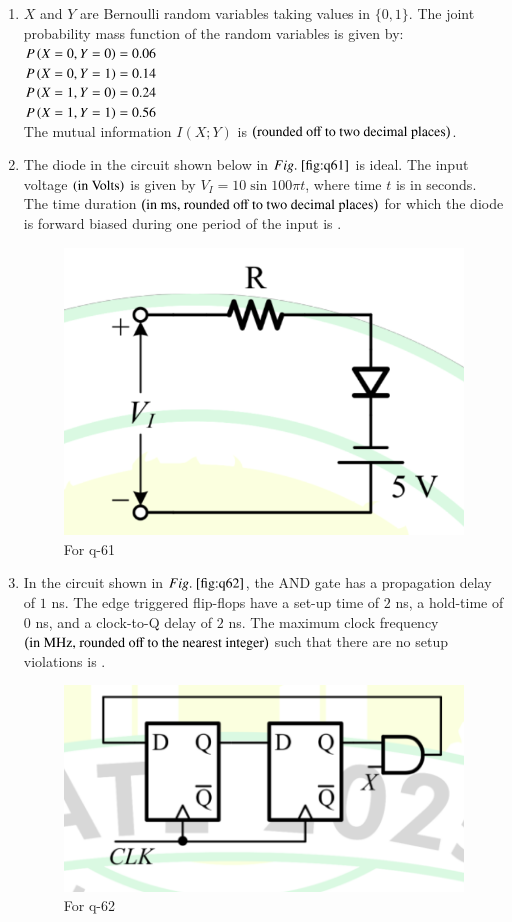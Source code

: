 \documentclass[journal,12pt,onecolumn]{IEEEtran}
\theoremstyle{remark}
\begin{document}
\begin{enumerate}
\hfill{}

\item $X$ and $Y$ are Bernoulli random variables taking values in $\{0,1\}$. The joint probability mass function of the random variables is given by:\\
$P\left(X = 0, Y = 0\right) = 0.06$\\
$P\left(X = 0, Y = 1\right) = 0.14$\\
$P\left(X = 1, Y = 0\right) = 0.24$\\
$P\left(X = 1, Y = 1\right) = 0.56$\\
The mutual information $I(X; Y)$ is \underline{\hspace{2cm}} $\left(\text{rounded off to two decimal places}\right)$.

\hfill{}

\item The diode in the circuit shown below in $\figref{fig:q61}$ is ideal. The input voltage $\left(\text{in Volts}\right)$ is given by $V_I = 10 \sin 100\pi t$, where time $t$ is in seconds. The time duration $\left(\text{in ms, rounded off to two decimal places}\right)$ for which the diode is forward biased during one period of the input is \underline{\hspace{2cm}}.
\begin{figure}[H]
\centering
\includegraphics[width=0.4\columnwidth]{q61}
\caption{For q-61}
\label{fig:q61}
\end{figure}

\hfill{}

\item In the circuit shown in $\figref{fig:q62}$, the AND gate has a propagation delay of $1$ ns. The edge triggered flip-flops have a set-up time of $2$ ns, a hold-time of $0$ ns, and a clock-to-Q delay of $2$ ns. The maximum clock frequency $\left(\text{in MHz, rounded off to the nearest integer}\right)$ such that there are no setup violations is \underline{\hspace{2cm}}.
\begin{figure}[H]
\centering
\includegraphics[width=0.5\columnwidth]{q62}
\caption{For q-62}
\label{fig:q62}
\end{figure}


\end{enumerate}
\end{document}
